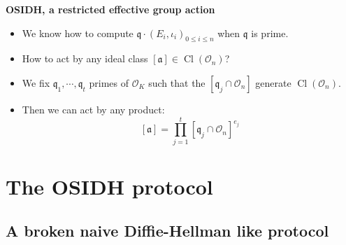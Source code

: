 \documentclass[10pt]{beamer}
\theoremstyle{plain}
\theoremstyle{definition}
\newcommand{\N}{\mathbb{N}}
\newcommand{\Z}{\mathbb{Z}}
\newcommand{\mO}{\mathcal{O}}
\renewcommand{\(}{\left(}
\renewcommand{\)}{\right)}
\newcommand{\mf}[1]{\mathfrak{#1}}
\newcommand{\mfq}{\mathfrak{q}}
\DeclareMathOperator{\Cl}{Cl}
\begin{document}
\begin{frame}
\textbf{OSIDH, a restricted effective group action}

\vspace{0.5cm}

\begin{itemize}
\item We know how to compute $\mf{q}\cdot (E_i,\iota_i)_{0\leq i\leq n}$ when $\mf{q}$ is prime.

\item How to act by any ideal class $[\mf{a}]\in\Cl(\mO_n)$?

\pause

\item We fix $\mfq_1, \cdots, \mfq_t$ primes of $\mO_K$ such that the $[\mfq_j\cap\mO_n]$ generate $\Cl(\mO_n)$.

\pause

\item Then we can act by any product:
\[[\mf{a}]=\prod_{j=1}^t [\mf{q}_j\cap\mO_n]^{e_j}\]
\end{itemize}

\end{frame}

\section{The OSIDH protocol}

\subsection{A broken naive Diffie-Hellman like protocol}


\end{document}
